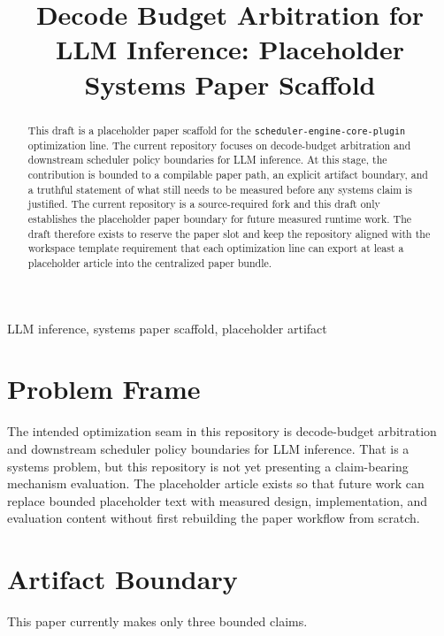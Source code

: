 \documentclass[conference]{IEEEtran}
\begin{document}
\title{Decode Budget Arbitration for LLM Inference: Placeholder Systems Paper Scaffold}

\author{}

\maketitle

\begin{abstract}
This draft is a placeholder paper scaffold for the \texttt{scheduler-engine-core-plugin} optimization line. The current repository focuses on decode-budget arbitration and downstream scheduler policy boundaries for LLM inference. At this stage, the contribution is bounded to a compilable paper path, an explicit artifact boundary, and a truthful statement of what still needs to be measured before any systems claim is justified. The current repository is a source-required fork and this draft only establishes the placeholder paper boundary for future measured runtime work. The draft therefore exists to reserve the paper slot and keep the repository aligned with the workspace template requirement that each optimization line can export at least a placeholder article into the centralized paper bundle.
\end{abstract}

\begin{IEEEkeywords}
LLM inference, systems paper scaffold, placeholder artifact
\end{IEEEkeywords}

\section{Problem Frame}

The intended optimization seam in this repository is decode-budget arbitration and downstream scheduler policy boundaries for LLM inference. That is a systems problem, but this repository is not yet presenting a claim-bearing mechanism evaluation. The placeholder article exists so that future work can replace bounded placeholder text with measured design, implementation, and evaluation content without first rebuilding the paper workflow from scratch.

\section{Artifact Boundary}

This paper currently makes only three bounded claims.
\end{document}
